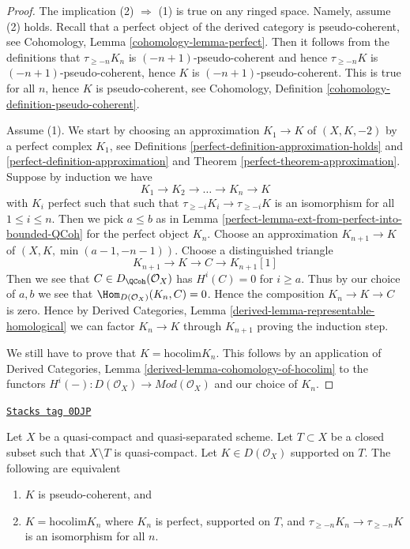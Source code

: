 \begin{proof}

The implication (2) $\Rightarrow$ (1) is true on any ringed space.
Namely, assume (2) holds. Recall that a perfect object of the derived
category is pseudo-coherent, see
Cohomology, Lemma \ref{cohomology-lemma-perfect}.
Then it follows from the definitions that
$\tau_{\geq -n}K_n$ is $(-n + 1)$-pseudo-coherent
and hence $\tau_{\geq -n}K$ is $(-n + 1)$-pseudo-coherent,
hence $K$ is $(-n + 1)$-pseudo-coherent. This is true for
all $n$, hence $K$ is pseudo-coherent, see
Cohomology, Definition \ref{cohomology-definition-pseudo-coherent}.

\medskip\noindent
Assume (1). We start by choosing an approximation
$K_1 \to K$ of $(X, K, -2)$ by a perfect complex $K_1$, see
Definitions \ref{perfect-definition-approximation-holds} and
\ref{perfect-definition-approximation} and
Theorem \ref{perfect-theorem-approximation}.
Suppose by induction we have
$$
K_1 \to K_2 \to \ldots \to K_n \to K
$$
with $K_i$ perfect such that
such that $\tau_{\geq -i}K_i \to \tau_{\geq -i}K$ is an isomorphism
for all $1 \leq i \leq n$. Then we pick $a \leq b$ as in
Lemma \ref{perfect-lemma-ext-from-perfect-into-bounded-QCoh}
for the perfect object $K_n$. Choose an approximation
$K_{n + 1} \to K$ of $(X, K, \min(a - 1, -n - 1))$.
Choose a distinguished triangle
$$
K_{n + 1} \to K \to C \to K_{n + 1}[1]
$$
Then we see that $C \in D_\QCoh(\mathcal{O}_X)$ has
$H^i(C) = 0$ for $i \geq a$. Thus by our choice of $a, b$
we see that $\Hom_{D(\mathcal{O}_X)}(K_n, C) = 0$.
Hence the composition $K_n \to K \to C$ is zero. Hence by
Derived Categories, Lemma \ref{derived-lemma-representable-homological}
we can factor $K_n \to K$ through $K_{n + 1}$
proving the induction step.

\medskip\noindent
We still have to prove that $K = \text{hocolim} K_n$.
This follows by an application of
Derived Categories, Lemma \ref{derived-lemma-cohomology-of-hocolim}
to the functors
$H^i( - ) : D(\mathcal{O}_X) \to \textit{Mod}(\mathcal{O}_X)$
and our choice of $K_n$.
\end{proof}

\begin{lemma}
\label{perfect-lemma-pseudo-coherent-hocolim-with-support}
\href{https://stacks.math.columbia.edu/tag/0DJP}{\texttt{Stacks tag 0DJP}}

Let $X$ be a quasi-compact and quasi-separated scheme.
Let $T \subset X$ be a closed subset such that $X \setminus T$
is quasi-compact. Let $K \in D(\mathcal{O}_X)$ supported on $T$.
The following are equivalent
\begin{enumerate}
\item $K$ is pseudo-coherent, and
\item $K = \text{hocolim} K_n$ where
$K_n$ is perfect, supported on $T$, and
$\tau_{\geq -n}K_n \to \tau_{\geq -n}K$ is an isomorphism for all $n$.
\end{enumerate}
\end{lemma}

